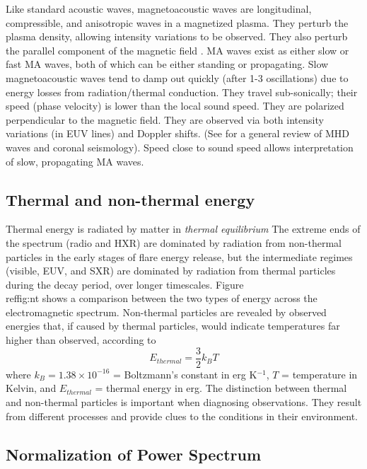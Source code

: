 Like standard acoustic waves, magnetoacoustic waves are longitudinal,
compressible, and anisotropic waves in a magnetized plasma.
They perturb the plasma density, allowing intensity variations to be
observed.
They also perturb the parallel component of the magnetic field
.
MA waves exist as either slow or fast MA waves, both of which can be either
standing or propagating.
Slow magnetoacoustic waves tend to damp out
quickly (after 1-3 oscillations) due to energy losses from
radiation/thermal conduction.
They travel sub-sonically; their
speed (phase velocity) is lower than the local sound speed.
They are polarized perpendicular to the magnetic field.
They are observed
via both intensity variations (in EUV lines) and Doppler shifts.
(See \cite{Nakariakov2005} for a general review of MHD waves and coronal
seismology).
Speed close to sound speed
allows interpretation of slow, propagating MA waves.



\subsection{Thermal and non-thermal energy}

Thermal energy is radiated by matter in \textit{thermal equilibrium}
The extreme ends of the spectrum (radio and HXR) are dominated by
radiation from non-thermal particles in the early stages of flare
energy release, but the intermediate regimes (visible, EUV, and SXR)
are dominated by radiation from thermal particles during the decay
period, over longer timescales.
Figure~\\ref{fig:nt} shows a comparison
between the two types of energy across the electromagnetic spectrum.
Non-thermal particles are revealed by observed energies that, if
caused by thermal particles, would indicate temperatures far higher
than observed, according to
\begin{equation}
    E_{thermal} = \frac{3}{2}k_{B}T
\end{equation}
where $k_{B} = 1.38 \times 10^{-16}$ = Boltzmann's constant in erg
K$^{-1}$, $T$ = temperature in Kelvin, and $ E_{thermal} $ = thermal
energy in erg. The distinction between thermal and non-thermal
particles is important when diagnosing observations. They result from
different processes and provide clues to the conditions in their
environment.


\subsection{Normalization of Power Spectrum}

